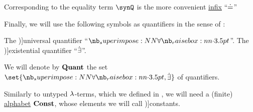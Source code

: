 \begin{definition}
\begin{thmenum}
     Corresponding to the equality term \( \synQ \) is the more convenient \hyperref[rem:first_order_formula_conventions/infix]{infix}  \enquote{\( \doteq \)}

     Finally, we will use the following symbols as quantifiers in the sense of :
    \begin{thmenum}[resume=def:simply_typed_hol_alphabet]
       The \term[ru=квантор общости (\cite[61]{Эдельман1975Логика})]{universal quantifier} \enquote{\( \synforall \)}.
       The \term[ru=квантор существования (\cite[61]{Эдельман1975Логика})]{existential quantifier} \enquote{\( \dot{\exists} \)}.
    \end{thmenum}

    We will denote by \( \op*{Quant} \) the set \( \set{ \synforall, \synexists } \) of quantifiers.
  \end{thmenum}
\end{definition}

\begin{definition}\label{def:syntax_of_simply_typed_hol}
  Similarly to untyped \( {\mathrm \lambda} \)-terms, which we defined in , we will need a (finite) \hyperref[def:formal_language/alphabet]{alphabet} \( \op*{Const} \), whose elements we will call \term[en=constants (\cite[202]{Andrews2002Logic})]{constants}.
\end{definition}

